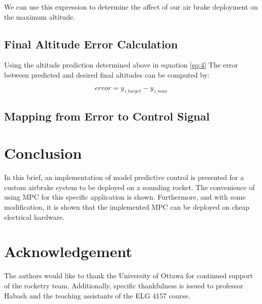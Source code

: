 \documentclass[conference, letterpaper]{IEEEtran}
\begin{document}
We can use this expression to determine the affect of our air brake deployment on the maximum altitude.

\subsection{Final Altitude Error Calculation}

Using the altitude prediction determined above in equation \ref{eq:4} The error between predicted and desired final altitudes can be computed by:

\begin{equation} \label{eq:5}
  error =  y_{z\_target} - y_{z\_max}
\end{equation}


\subsection{Mapping from Error to Control Signal}

\section{Conclusion}

In this brief, an implementation of model predictive control is presented for a
custom airbrake system to be deployed on a sounding rocket. The convenience of
using MPC for this specific application is shown. Furthermore, and with some
modification, it is shown that the implemented MPC can be deployed on cheap electrical
hardware.

\section{Acknowledgement}

The authors would like to thank the University of Ottawa for continued support of the
rocketry team. Additionally, specific thankfulness is issued to professor Habash and
the teaching assistants of the ELG 4157 course.



\end{document}
